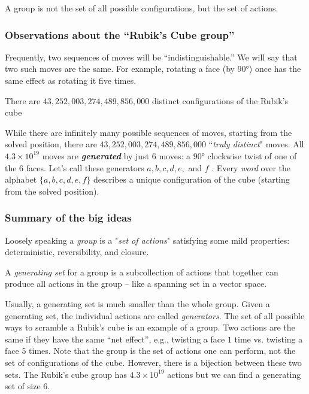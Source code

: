 \documentclass{article}
\begin{document}
A group is not the set of all possible configurations, but the set of actions.

\subsubsection{Observations about the “Rubik’s Cube group”}
Frequently, two sequences of moves will be “indistinguishable.” We will say that
two such moves are the same. For example, rotating a face (by $\ang{90}$) once
has the same effect as rotating it five times.
\begin{fact}
    There are $43,252,003,274,489,856,000$ distinct configurations of the
    Rubik’s cube
\end{fact}
While there are infinitely many possible sequences of moves, starting from the solved
position, there are $43,252,003,274,489,856,000$ “\emph{truly distinct}" moves.
\medbreak
All $4.3 \times 10^{19}$ moves are \emph{\textbf{generated}} by just $6$ moves: a $\ang{90}$ clockwise
twist of one of the $6$ faces.
\medbreak
Let’s call these generators $a, b, c, d, e,$ and $f$ . Every \emph{word} over the
alphabet $\{a, b, c, d, e, f \}$ describes a unique configuration of the cube
(starting from the solved position).
\medbreak
\subsubsection{Summary of the big ideas}

Loosely speaking a \emph{group} is a "\emph{set of actions}" satisfying some
mild properties: deterministic, reversibility, and closure.

\begin{defi}
    A \emph{generating set} for a group is a subcollection of actions that together
    can produce all actions in the group – like a spanning set in a vector space.
\end{defi}

Usually, a generating set is much smaller than the whole group.
\medbreak
Given a generating set, the individual actions are called \emph{generators}.
\medbreak
The set of all possible ways to scramble a Rubik’s cube is an example of a
group. Two actions are the same if they have the same “net effect”, e.g.,
twisting a face $1$ time vs. twisting a face $5$ times.
\medbreak
Note that the group is the set of actions one can perform, not the set of
configurations of the cube. However, there is a bijection between these two
sets.
\medbreak
The Rubik’s cube group has $4.3 \times 10^{19}$ actions but we can find a
generating set of size $6$.
\end{document}
